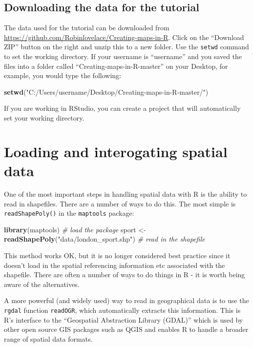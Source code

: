 \documentclass[]{article}
\newenvironment{Shaded}{}{}
\newcommand{\KeywordTok}[1]{\textcolor[rgb]{0.00,0.44,0.13}{\textbf{{#1}}}}
\newcommand{\StringTok}[1]{\textcolor[rgb]{0.25,0.44,0.63}{{#1}}}
\newcommand{\CommentTok}[1]{\textcolor[rgb]{0.38,0.63,0.69}{\textit{{#1}}}}
\newcommand{\NormalTok}[1]{{#1}}
\begin{document}
\subsection{Downloading the data for the tutorial}

The data used for the tutorial can be downloaded from
\href{https://github.com/Robinlovelace/Creating-maps-in-R}{https://github.com/Robinlovelace/Creating-maps-in-R}.
Click on the ``Download ZIP'' button on the right and unzip this to a
new folder. Use the \texttt{setwd} command to set the working directory.
If your username is ``username'' and you saved the files into a folder
called ``Creating-maps-in-R-master'' on your Desktop, for example, you
would type the following:

\begin{Shaded}
\begin{Highlighting}[]
\KeywordTok{setwd}\NormalTok{(}\StringTok{"C:/Users/username/Desktop/Creating-maps-in-R-master/"}\NormalTok{)}
\end{Highlighting}
\end{Shaded}
If you are working in RStudio, you can create a project that will
automatically set your working directory.

\section{Loading and interogating spatial data}

One of the most important steps in handling spatial data with R is the
ability to read in shapefiles. There are a number of ways to do this.
The most simple is \texttt{readShapePoly()} in the \texttt{maptools}
package:

\begin{Shaded}
\begin{Highlighting}[]
\KeywordTok{library}\NormalTok{(maptools)  }\CommentTok{# load the package}
\NormalTok{sport <- }\KeywordTok{readShapePoly}\NormalTok{(}\StringTok{"data/london_sport.shp"}\NormalTok{)  }\CommentTok{# read in the shapefile}
\end{Highlighting}
\end{Shaded}
This method works OK, but it is no longer considered best practice since
it doesn't load in the spatial referencing information etc associated
with the shapefile. There are often a number of ways to do things in R -
it is worth being aware of the alternatives.

A more powerful (and widely used) way to read in geographical data is to
use the \texttt{rgdal} function \texttt{readOGR}, which automatically
extracts this information. This is R's interface to the ``Geospatial
Abstraction Library (GDAL)'' which is used by other open source GIS
packages such as QGIS and enables R to handle a broader range of spatial
data formats.
\end{document}
